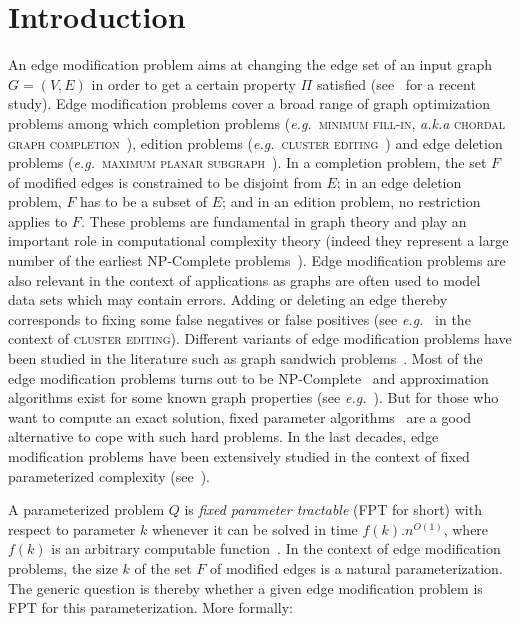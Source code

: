 \documentclass[11pt]{article}
\newcommand{\eg}{\textit{e.g.}}
\begin{document}
\section{Introduction}

An edge modification problem aims at changing the edge set of an input graph $G=(V,E)$ in order to get a certain property $\Pi$ satisfied (see~\cite{NSS01} for a recent study). Edge modification problems cover a broad range of graph optimization problems among which completion problems (\eg ~\textsc{minimum fill-in}, \emph{a.k.a}  \textsc{chordal graph completion}~\cite{Ros72,TY84}), edition problems (\eg ~\textsc{cluster editing}~\cite{SST04}) and edge deletion problems (\eg ~\textsc{maximum planar subgraph}~\cite{GJ79}).  In a completion problem, the set $F$ of modified edges is constrained to be disjoint from $E$; in an edge deletion problem, $F$ has to be a subset of $E$; and in an edition problem, no restriction applies to $F$. These problems are fundamental in graph theory and play an important role in computational complexity theory (indeed they represent a large number of the earliest NP-Complete problems~\cite{GJ79}). Edge modification problems are also relevant in the context of applications as graphs are often used to model data sets which may contain errors. Adding or deleting an edge thereby corresponds to fixing some false negatives or false positives (see \emph{e.g.}~\cite{SST04} in the context of \textsc{cluster editing}). Different variants of edge modification problems have been studied in the literature such as graph sandwich problems~\cite{GKS95}.
Most of the edge modification problems turns out to be NP-Complete~\cite{NSS01} and approximation algorithms exist for some known graph properties (see \eg~\cite{KS07,ZW08}). But for those who want to compute an exact solution, fixed parameter algorithms~\cite{DF99,FG06,Nie06} are a good alternative to cope with such hard problems. In the last decades, edge modification problems have been extensively studied in the context of fixed parameterized complexity (see~\cite{Cai96,FLR07,HPTV07}). 

A parameterized problem $Q$ is \emph{fixed parameter tractable} (FPT for short) with respect to parameter $k$ whenever it can be solved in time $f(k).n^{O(1)}$, where $f(k)$ is an arbitrary computable function~\cite{DF99,Nie06}. 
In the context of edge modification problems, the size $k$ of the set $F$ of modified edges is a natural parameterization. The generic question is thereby whether a given edge modification problem is FPT for this parameterization. More formally:
\end{document}
